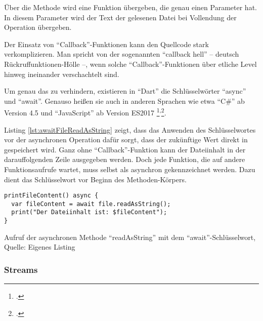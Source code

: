 Über die Methode  wird eine Funktion übergeben, die genau einen Parameter hat.
In diesem Parameter wird der Text der gelesenen Datei bei Vollendung der Operation übergeben.

Der Einsatz von \enquote{Callback}-Funktionen kann den Quellcode stark verkomplizieren.
 Man spricht von der sogenannten \enquote{callback hell} -- deutsch Rückruffunktionen-Hölle --, wenn solche \enquote{Callback}-Funktionen über etliche Level hinweg ineinander verschachtelt sind.

Um genau das zu verhindern, existieren in \enquote{Dart} die Schlüsselwörter \enquote{async} und \enquote{await}.
Genauso heißen sie auch in anderen Sprachen wie etwa \enquote{C\#} ab Version 4.5 und \enquote{JavaScript} ab Version ES2017
\footcite[Vgl.][]{asyncfunctionJavaScriptMDN}\textsuperscript{,}\footcite[Vgl.][]{Asynchronousprogrammingwithasyncandawait}.





Listing \ref{lst:awaitFileReadAsString} zeigt,
dass das Anwenden des Schlüsselwortes  vor der asynchronen Operation  dafür sorgt,
dass der zukünftige Wert direkt in  gespeichert wird.
Ganz ohne \enquote{Callback}-Funktion kann der Dateiinhalt in der darauffolgenden Zeile ausgegeben werden.
Doch jede Funktion, die auf andere Funktionsaufrufe wartet, muss selbst als asynchron gekennzeichnet werden.
Dazu dient das  Schlüsselwort vor Beginn des Methoden-Körpers.

\ifIncludeFigures
  \begin{listing}[ht]
    \begin{verbatim}
printFileContent() async {
  var fileContent = await file.readAsString();
  print("Der Dateiinhalt ist: $fileContent");
}
\end{verbatim}
    \caption[Aufruf der asynchronen Methode \enquote{readAsString} mit dem \enquote{await}-Schlüsselwort]{Aufruf der asynchronen Methode \enquote{readAsString} mit dem \enquote{await}-Schlüsselwort, Quelle: Eigenes Listing}
    \label{lst:awaitFileReadAsString}
  \end{listing}
\fi



\subsubsection{Streams}

